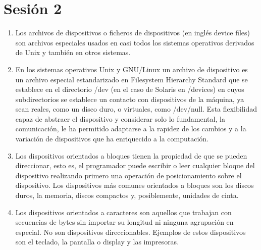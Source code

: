 \section{Sesión 2}
\begin{enumerate}
    \item Los archivos de dispositivos o ficheros de dispositivos (en inglés device files) son archivos especiales usados en casi todos los sistemas operativos derivados de Unix y también en otros sistemas.
    \item En los sistemas operativos Unix y GNU/Linux un archivo de dispositivo es un archivo especial estandarizado en Filesystem Hierarchy Standard que se establece en el directorio /dev (en el caso de Solaris en /devices) en cuyos subdirectorios se establece un contacto con dispositivos de la máquina, ya sean reales, como un disco duro, o virtuales, como /dev/null. Esta flexibilidad capaz de abstraer el dispositivo y considerar solo lo fundamental, la comunicación, le ha permitido adaptarse a la rapidez de los cambios y a la variación de dispositivos que ha enriquecido a la computación.
    \item Los dispositivos orientados a bloques tienen la propiedad de que se pueden direccionar, esto es, el programador puede escribir o leer cualquier bloque del dispositivo realizando primero una operación de posicionamiento sobre el dispositivo. Los dispositivos más comunes orientados a bloques son los discos duros, la memoria, discos compactos y, posiblemente, unidades de cinta.
    \item Los dispositivos orientados a caracteres son aquellos que trabajan con secuencias de bytes sin importar su longitud ni ninguna agrupación en especial. No son dispositivos direccionables. Ejemplos de estos dispositivos son el teclado, la pantalla o display y las impresoras.
\end{enumerate}